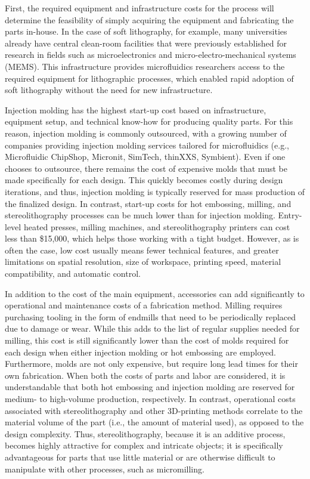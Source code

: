 First, the required equipment and infrastructure costs for the process will determine the feasibility of simply acquiring the equipment and fabricating the parts in-house. In the case of soft lithography, for example, many universities already have central clean-room facilities that were previously established for research in fields such as microelectronics and micro-electro-mechanical systems (MEMS). This infrastructure provides microfluidics researchers access to the required equipment for lithographic processes, which enabled rapid adoption of soft lithography without the need for new infrastructure.

Injection molding has the highest start-up cost based on infrastructure, equipment setup, and technical know-how for producing quality parts. For this reason, injection molding is commonly outsourced, with a growing number of companies providing injection molding services tailored for microfluidics (e.g., Microfluidic ChipShop, Micronit, SimTech, thinXXS, Symbient). Even if one chooses to outsource, there remains the cost of expensive molds that must be made specifically for each design. This quickly becomes costly during design iterations, and thus, injection molding is typically reserved for mass production of the finalized design. In contrast, start-up costs for hot embossing, milling, and stereolithography processes can be much lower than for injection molding. Entry-level heated presses, milling machines, and stereolithography printers can cost less than \$15,000, which helps those working with a tight budget. However, as is often the case, low cost usually means fewer technical features, and greater limitations on spatial resolution, size of workspace, printing speed, material compatibility, and automatic control. 

In addition to the cost of the main equipment, accessories can add significantly to operational and maintenance costs of a fabrication method. Milling requires purchasing tooling in the form of endmills that need to be periodically replaced due to damage or wear. While this adds to the list of regular supplies needed for milling, this cost is still significantly lower than the cost of molds required for each design when either injection molding or hot embossing are employed. Furthermore, molds are not only expensive, but require long lead times for their own fabrication. When both the costs of parts and labor are considered, it is understandable that both hot embossing and injection molding are reserved for medium- to high-volume production, respectively. In contrast, operational costs associated with stereolithography and other 3D-printing methods correlate to the material volume of the part (i.e., the amount of material used), as opposed to the design complexity. Thus, stereolithography, because it is an additive process, becomes highly attractive for complex and intricate objects; it is specifically advantageous for parts that use little material or are otherwise difficult to manipulate with other processes, such as micromilling. 

